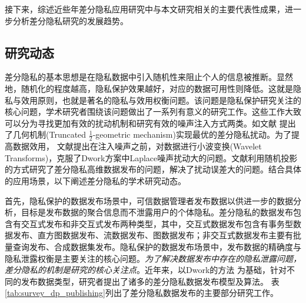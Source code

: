 接下来，综述近些年差分隐私应用研究中与本文研究相关的主要代表性成果，进一步分析差分隐私研究的发展趋势。

\subsection{研究动态}
差分隐私的基本思想是在隐私数据中引入随机性来阻止个人的信息被推断。显然地，随机化的程度越高，隐私保护效果越好，对应的数据可用性则降低。这就是隐私与效用原则\cite{sankar2013utility}，也就是著名的隐私与效用权衡问题\cite{basciftci2016on,alvim2011differential}。该问题是隐私保护研究关注的核心问题，学术研究者围绕该问题做出了一系列有意义的研究工作。这些工作大致可以分为寻找更加有效的扰动机制\cite{ghosh2012universally,wang2016on,alvim2011differential}和研究有效的噪声注入方式\cite{geng2016the}两类。如文献 提出了几何机制(Truncated $\frac{1}{2}$-geometric mechanism)实现最优的差分隐私扰动。为了提高数据效用， 文献提出在注入噪声之前，对数据进行小波变换(Wavelet Transforms)，克服了Dwork方案中Laplace噪声扰动大的问题。文献利用随机投影的方式研究了差分隐私高维数据发布的问题，解决了扰动误差大的问题。结合具体的应用场景，以下阐述差分隐私的学术研究动态。

首先，隐私保护的数据发布场景中，可信数据管理者发布数据以供进一步的数据分析\cite{aggarwal2008privacy}，目标是发布数据的聚合信息而不泄露用户的个体隐私。差分隐私的数据发布包含有交互式发布和非交互式发布两种类型，其中，交互式数据发布包含有事务型数据发布、直方图数据发布、流数据发布、图数据发布；非交互式数据发布主要有批量查询发布、合成数据集发布\cite{zhu2017differentially}。隐私保护的数据发布场景中，发布数据的精确度与隐私泄露权衡是主要关注的核心问题。{\em 为了解决数据发布中存在的隐私泄露问题，差分隐私的机制是研究的核心关注点}。近年来，以Dwork的方法
\cite{dwork2006calibrating}为基础，针对不同的发布数据类型，研究者提出了诸多的差分隐私数据发布模型及算法。
表\ref{tab:survey_dp_publishing}列出了差分隐私数据发布的主要部分研究工作。


